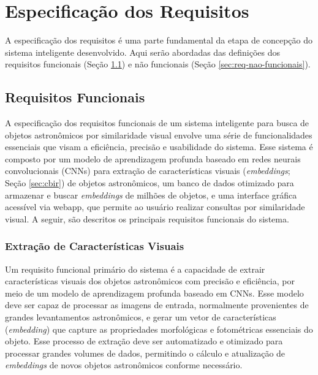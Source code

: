 \chapter{Especificação dos Requisitos}
\label{cap:req}

A especificação dos requisitos é uma parte fundamental da etapa de concepção do sistema inteligente desenvolvido. Aqui serão abordadas das definições dos requisitos funcionais (Seção \ref{sec:req-funcionais}) e não funcionais (Seção \ref{sec:req-nao-funcionais}).





\section{Requisitos Funcionais}
\label{sec:req-funcionais}

A especificação dos requisitos funcionais de um sistema inteligente para busca de objetos astronômicos por similaridade visual envolve uma série de funcionalidades essenciais que visam a eficiência, precisão e usabilidade do sistema. Esse sistema é composto por um modelo de aprendizagem profunda baseado em redes neurais convolucionais (CNNs) para extração de características visuais (\emph{embeddings}; Seção \ref{sec:cbir}) de objetos astronômicos, um banco de dados otimizado para armazenar e buscar \emph{embeddings} de milhões de objetos, e uma interface gráfica acessível via webapp, que permite ao usuário realizar consultas por similaridade visual. A seguir, são descritos os principais requisitos funcionais do sistema.






\subsection{Extração de Características Visuais}
\label{sec:req-embeddings}

Um requisito funcional primário do sistema é a capacidade de extrair características visuais dos objetos astronômicos com precisão e eficiência, por meio de um modelo de aprendizagem profunda baseado em CNNs. Esse modelo deve ser capaz de processar as imagens de entrada, normalmente provenientes de grandes levantamentos astronômicos, e gerar um vetor de características (\emph{embedding}) que capture as propriedades morfológicas e fotométricas essenciais do objeto. Esse processo de extração deve ser automatizado e otimizado para processar grandes volumes de dados, permitindo o cálculo e atualização de \emph{embeddings} de novos objetos astronômicos conforme necessário.






